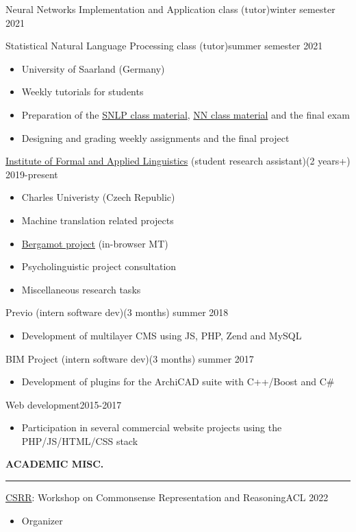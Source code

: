 \documentclass[11pt,a4paper]{article} %
\newcommand{\hSection}[1]{
    \medskip
    \MakeUppercase{\bf #1}
    \medskip
    \hrule
}
\newcommand{\hSubsection}[2]{{#1}\hfill {#2}}
\newcommand{\hSubsectionItemize}[3]{
    {#1}\hfill {\footnotesize #2}\hspace{-1cm}\\
    \vspace{-0.5cm}
    \begin{itemize} \footnotesize #3 \end{itemize}
    \vspace{0.3\baselineskip}
}
\begin{document}
\hSubsection{Neural Networks Implementation and Application class (tutor)}{\footnotesize winter semester 2021 \hspace{-1.3cm}}
\vspace{-0.2cm}

\hSubsectionItemize
{Statistical Natural Language Processing class (tutor)}
{summer semester 2021}
{
    \item University of Saarland (Germany)
    \item Weekly tutorials for students
    \item Preparation of the \href{https://github.com/zouharvi/uds-snlp-tutorial}{SNLP class material}, \href{https://github.com/zouharvi/uds-nn-tutorial}{NN class material} and the final exam
    \item Designing and grading weekly assignments and the final project
}

\hSubsectionItemize
{\href{https://ufal.mff.cuni.cz}{Institute of Formal and Applied Linguistics} (student research assistant)}
{(2 years+) 2019-present}
{
    \item Charles Univeristy (Czech Republic)
    \item Machine translation related projects
    \item \href{https://browser.mt/}{Bergamot project} (in-browser MT)
    \item Psycholinguistic project consultation
    \item Miscellaneous research tasks
}

\hSubsectionItemize
{Previo (intern software dev)}
{(3 months) summer 2018}
{
    \item Development of multilayer CMS using JS, PHP, Zend and MySQL
}

\hSubsectionItemize
{BIM Project (intern software dev)}
{(3 months) summer 2017}
{
    \item Development of plugins for the ArchiCAD suite with C++/Boost and C\#
}

\hSubsectionItemize
{Web development}
{2015-2017}
{
\item Participation in several commercial website projects using the PHP/JS/HTML/CSS stack
}


\hSection{Academic Misc.}

\hSubsectionItemize
{\href{https://csrr-workshop.github.io/}{CSRR}: Workshop on Commonsense Representation and Reasoning}
{ACL 2022}
{
\item Organizer
}
\end{document}
